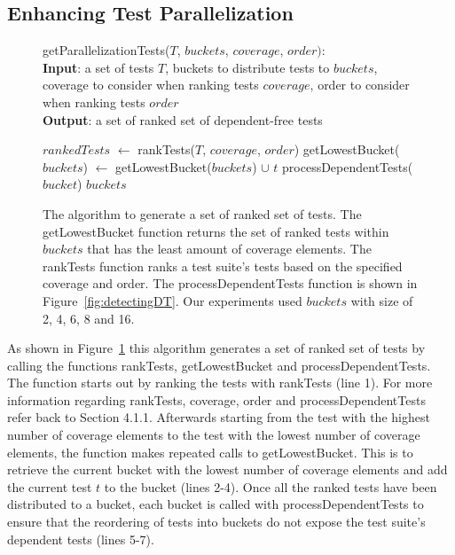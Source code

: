 \subsection{Enhancing Test Parallelization}
\label{sec:enhancepar}
\begin{figure}[t]
	getParallelizationTests($\mathit{T}$, $\mathit{buckets}$, $\mathit{coverage}$, $\mathit{order}):$\\
	\textbf{Input}: a set of tests $\mathit{T}$, buckets to distribute tests to $\mathit{buckets}$, coverage to consider when ranking tests $\mathit{coverage}$, order to consider when ranking tests $\mathit{order}$\\
	\textbf{Output}: a set of ranked set of dependent-free tests\\
	 \begin{algorithmic}[1]
	 	\vspace{-5mm}
		\STATE $\mathit{rankedTests}$ $\leftarrow$ rankTests($\mathit{T}$, $\mathit{coverage}$, $\mathit{order}$)
			\STATE getLowestBucket($\mathit{buckets}$) $\leftarrow$ getLowestBucket($\mathit{buckets}$) $\cup$ $\mathit{t}$
		\ENDFOR
			\STATE processDependentTests($\mathit{bucket}$)
		\ENDFOR
		\RETURN $\mathit{buckets}$
	\end{algorithmic}
	\vspace{-3mm}
	\caption {
		The algorithm to generate a set of ranked set of tests. The getLowestBucket function returns the set of ranked tests within $\mathit{buckets}$ that has the least amount of coverage elements. The rankTests function ranks a test suite's tests based on the specified coverage and order. The processDependentTests function is shown in Figure~\ref{fig:detectingDT}. Our experiments used $\mathit{buckets}$ with size of 2, 4, 6, 8 and 16.
	}
	\label{fig:parallelization}
\end{figure}
As shown in Figure~\ref{fig:parallelization} this algorithm generates a set of ranked set of tests by calling the functions rankTests, getLowestBucket and processDependentTests. The function starts out by ranking the tests with rankTests (line 1). For more information regarding rankTests, coverage, order and processDependentTests refer back to Section 4.1.1. Afterwards starting from the test with the highest number of coverage elements to the test with the lowest number of coverage elements, the function makes repeated calls to getLowestBucket. This is to retrieve the current bucket with the lowest number of coverage elements and add the current test $\mathit{t}$ to the bucket (lines 2-4). Once all the ranked tests have been distributed to a bucket, each bucket is called with processDependentTests to ensure that the reordering of tests into buckets do not expose the test suite's dependent tests (lines 5-7). 
